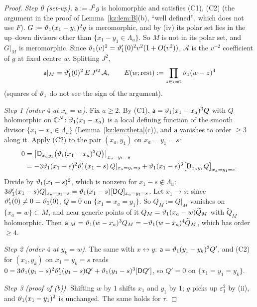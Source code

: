 \begin{proof}
\emph{Step 0 (set-up).} $\mathsf a:=J^2g$ is holomorphic and satisfies (C1), (C2) (the argument in the proof of
Lemma~\ref{kz:lem:B}(b), ``well defined'', which does not use $F$). $G:=\vartheta_1(x_1-y_1)^2g$ is meromorphic, and by
(iv) its polar set lies in the up--down divisors other than $\{x_1-y_1\in\Lambda_u\}$. So $M$ is not in its polar
set, and $G|_M$ is meromorphic. Since $\vartheta_1(v)^2=\vartheta_1'(0)^2v^2(1+O(v^2))$, $\mathcal A$ is the $v^{-2}$
coefficient of $g$ at fixed centre $w$. Splitting $J^2$,
\begin{equation}\label{kz:eq:merge}
\mathsf a|_M=\vartheta_1'(0)^2\,E\,J'^2\,\mathcal A,\qquad E(w;\mathrm{rest}):=\prod_{z\in\mathrm{rest}}\vartheta_1(w-z)^4
\end{equation}
(squares of $\vartheta_1$ do not see the sign of the argument).

\emph{Step 1 (order $4$ at $x_a=w$).} Fix $a\ge2$. By (C1),
$\mathsf a=\vartheta_1(x_1-x_a)^3Q$ with $Q$ holomorphic on $\mathbb{C}^N$: $\vartheta_1(x_1-x_a)$ is a local defining function of the
smooth divisor $\{x_1-x_a\in\Lambda_u\}$ (Lemma~\ref{kz:lem:theta}(c)), and $\mathsf a$ vanishes to order $\ge3$ along
it. Apply (C2) to the pair $(x_a,y_1)$ on $x_a=y_1=s$:
\begin{align*}
0&=\big[\mathsf{D}_{x_ay_1}\big(\vartheta_1(x_1-x_a)^3Q\big)\big]_{x_a=y_1=s}\\
&=-3\vartheta_1(x_1-s)^2\vartheta_1'(x_1-s)\,Q|_{x_a=y_1=s}+\vartheta_1(x_1-s)^3\big[\mathsf{D}_{x_ay_1}Q\big]_{x_a=y_1=s}.
\end{align*}
Divide by $\vartheta_1(x_1-s)^2$, which is nonzero for $x_1-s\notin\Lambda_u$:
$3\vartheta_1'(x_1-s)Q|_{x_a=y_1=s}=\vartheta_1(x_1-s)[\mathsf{D} Q]_{x_a=y_1=s}$. Let $x_1\to s$: since $\vartheta_1'(0)\ne0=\vartheta_1(0)$,
$Q=0$ on $\{x_1=x_a=y_1\}$. So $Q_M:=Q|_M$ vanishes on $\{x_a=w\}\subset M$, and near generic points of it
$Q_M=\vartheta_1(x_a-w)\widetilde Q_M$ with $\widetilde Q_M$ holomorphic. Then $\mathsf a|_M=\vartheta_1(w-x_a)^3Q_M=-\vartheta_1(w-x_a)^4\widetilde Q_M$,
which has order $\ge4$.

\emph{Step 2 (order $4$ at $y_k=w$).} The same with $x\leftrightarrow y$: $\mathsf a=\vartheta_1(y_1-y_k)^3Q'$, and (C2) for
$(x_1,y_k)$ on $x_1=y_k=s$ reads $0=3\vartheta_1(y_1-s)^2\vartheta_1'(y_1-s)Q'+\vartheta_1(y_1-s)^3[\mathsf{D} Q']$, so $Q'=0$ on
$\{x_1=y_1=y_k\}$.

\emph{Step 3 (proof of (b)).} Shifting $w$ by $1$ shifts $x_1$ and $y_1$ by $1$; $g$ picks up $\varepsilon_1^2$ by (ii),
and $\vartheta_1(x_1-y_1)^2$ is unchanged. The same holds for $\tau$.


\end{proof}
